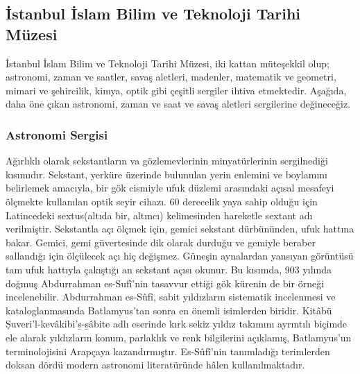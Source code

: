 \subsection{İstanbul İslam Bilim ve Teknoloji Tarihi Müzesi}
\indent\indent İstanbul İslam Bilim ve Teknoloji Tarihi Müzesi, iki kattan müteşekkil olup; astronomi, zaman ve saatler, savaş aletleri, madenler, matematik ve geometri, mimari ve şehircilik, kimya, optik gibi çeşitli sergiler ihtiva etmektedir. Aşağıda, daha öne çıkan astronomi, zaman ve saat ve savaş aletleri sergilerine değineceğiz.
\subsubsection{Astronomi Sergisi}
\indent\indent Ağırlıklı olarak sekstantların va gözlemevlerinin minyatürlerinin sergilnediği kısımıdır. Sekstant, yerküre üzerinde bulunulan yerin enlemini ve boylamını belirlemek amacıyla, bir gök cismiyle ufuk düzlemi arasındaki açısal mesafeyi ölçmekte kullanılan optik seyir cihazı.\cite{sekstant} 60 derecelik yaya sahip olduğu için Latincedeki sextus(altıda bir, altıncı) kelimesinden hareketle sextant adı verilmiştir. Sekstantla açı ölçmek için, gemici sekstant dürbününden, ufuk hattına bakar. Gemici, gemi güvertesinde dik olarak durduğu ve gemiyle beraber sallandığı için ölçülecek açı hiç değişmez. Güneşin aynalardan yansıyan görüntüsü tam ufuk hattıyla çakıştığı an sekstant açısı okunur.\newline
\indent Bu kısımda, 903 yılında doğmuş Abdurrahman es-Sufî'nin tasavvur ettiği gök kürenin de bir örneği incelenebilir. Abdurrahman es-Sûfî, sabit yıldızların sistematik incelenmesi ve kataloglanmasında Batlamyus’tan sonra en önemli isimlerden biridir. Kitâbü Ṣuveri’l-kevâkibi’s̱-s̱âbite adlı eserinde kırk sekiz yıldız takımını ayrıntılı biçimde ele alarak yıldızların konum, parlaklık ve renk bilgilerini açıklamış, Batlamyus’un terminolojisini Arapçaya kazandırmıştır. Es-Sûfî’nin tanımladığı terimlerden doksan dördü modern astronomi literatüründe hâlen kullanılmaktadır.\cite{dia_8}\newline
